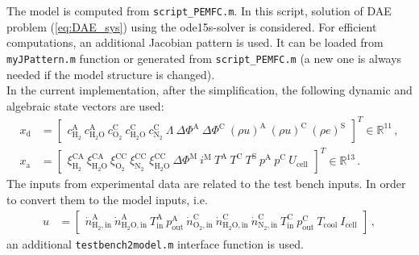 \documentclass[pdftex,a4paper, 12pt]{article}
\begin{document}
%
%
The model is computed from \texttt{script\_PEMFC.m}. In this script, solution of DAE problem (\ref{eq:DAE_sys}) using the ode15s-solver is considered. For efficient computations, an additional Jacobian pattern is used. It can be loaded from \texttt{myJPattern.m} function or generated from \texttt{script\_PEMFC.m} (a new one is always needed if the model structure is changed). \\
%
In the current implementation, after the simplification, the following dynamic and algebraic state vectors are used:
%
\begin{align}
	x_{\mathrm{d}} &= \begin{bmatrix} c_{\mathrm{H_2}}^{\mathrm{A}} ~c_{\mathrm{H_2O}}^{\mathrm{A}} ~c_{\mathrm{O_2}}^{\mathrm{C}} ~c_{\mathrm{H_2O}}^{\mathrm{C}} ~c_{\mathrm{N_2}}^{\mathrm{C}} ~\Lambda ~\Delta \mathit{\Phi}^{\mathrm{A}} ~\Delta \mathit{\Phi}^{\mathrm{C}} ~(\rho u)^{\mathrm{A}} ~(\rho u)^{\mathrm{C}} ~(\rho e)^{\mathrm{S}} \end{bmatrix}^T  \in \mathbb{R}^{11} \, ,
	\label{eq:dyn_state_vector} \\
	x_{\mathrm{a}} &= \begin{bmatrix} \xi_{\mathrm{H_2}}^{\mathrm{CA}} ~\xi_{\mathrm{H_2O}}^{\mathrm{CA}} ~\xi_{\mathrm{O_2}}^{\mathrm{CC}} ~\xi_{\mathrm{N_2}}^{\mathrm{CC}} ~\xi_{\mathrm{H_2O}}^{\mathrm{CC}}
		~\Delta \mathit{\Phi}^{\mathrm{M}} ~i^{\mathrm{M}}  ~T^{\mathrm{A}}  ~T^{\mathrm{C}}  ~T^{\mathrm{S}}  ~p^{\mathrm{A}}  ~p^{\mathrm{C}}  ~U_{\mathrm{cell}} \end{bmatrix}^T  \in \mathbb{R}^{13} \, .
	\label{eq:alg_state_vector}
\end{align}
%
The inputs from experimental data are related to the test bench inputs. In order to convert them to the model inputs, i.e.
%
\begin{align}
	u &= \begin{bmatrix} \dot{n}_{\mathrm{H_2,in}}^{\mathrm{A}} ~\dot{n}_{\mathrm{H_2O,in}}^{\mathrm{A}} ~T^{\mathrm{A}}_{\mathrm{in}} ~p^{\mathrm{A}}_{\mathrm{out}} ~\dot{n}_{\mathrm{O_2,in}}^{\mathrm{C}} ~\dot{n}_{\mathrm{H_2O,in}}^{\mathrm{C}} ~\dot{n}_{\mathrm{N_2,in}}^{\mathrm{C}} ~T^{\mathrm{C}}_{\mathrm{in}} ~p^{\mathrm{C}}_{\mathrm{out}} ~T_{\mathrm{cool}} ~I_{\mathrm{cell}} \end{bmatrix}  \, ,
	\label{eq:input_vector}
\end{align}
%
an additional \texttt{testbench2model.m} interface function is used. 
%
\end{document}
